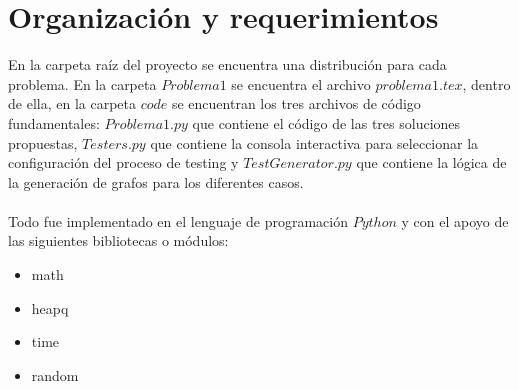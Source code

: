 \documentclass{article}
\begin{document}
\section{Organización y requerimientos}

En la carpeta raíz del proyecto se encuentra una distribución para cada problema. En la carpeta $Problema 1$ se encuentra el archivo $problema1.tex$, dentro de ella, en la carpeta $code$ se encuentran los tres archivos de código fundamentales: $Problema1.py$ que contiene el código de las tres soluciones propuestas, $Testers.py$ que contiene la consola interactiva para seleccionar la configuración del proceso de testing y $TestGenerator.py$ que contiene la lógica de la generación de grafos para los diferentes casos.
\\
\\
Todo fue implementado en el lenguaje de programación $Python$ y con el apoyo de las siguientes bibliotecas o módulos:
\begin{itemize}
    \item math
    \item heapq
    \item time 
    \item random
\end{itemize}
\end{document}
